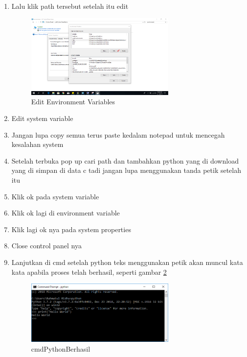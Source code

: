 \begin{enumerate}
\item	Lalu klik path tersebut setelah itu edit
\begin{figure}[ht]
	\centerline{\includegraphics[width=0.70\textwidth]{figures/edit_ev.PNG}}
	\caption{Edit Environment Variables}
	\label{edit_ev}
\end{figure}
	
\item	Edit system variable
	
\item	Jangan lupa copy semua terus paste kedalam notepad untuk mencegah kesalahan system
	
\item	Setelah terbuka pop up cari path dan tambahkan python yang di download yang di simpan di data c tadi jangan lupa menggunakan tanda petik setelah itu
	
\item	Klik ok pada system variable
\item	Klik ok lagi di environment variable
	
\item	Klik lagi ok nya pada system properties
	
\item	Close control panel nya
	
\item 	Lanjutkan di cmd setelah python teks menggunakan petik akan muncul kata kata apabila proses telah berhasil, seperti gambar \ref{cmdPythonBerhasil}
\begin{figure}[ht]
	\centerline{\includegraphics[width=0.70\textwidth]{figures/cmdPythonBerhasil.PNG}}
	\caption{cmdPythonBerhasil}
	\label{cmdPythonBerhasil}
\end{figure}
\end{enumerate}

